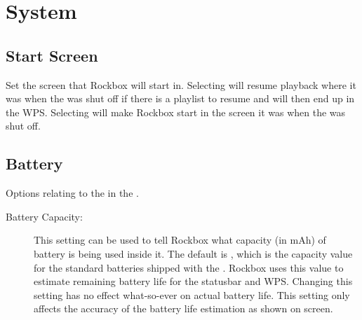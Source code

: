 \section{\label{ref:SystemOptions}System}
\subsection{Start Screen}
    Set the screen that Rockbox will start in. Selecting
     will resume playback where it was when the \dap{}
    was shut off if there is a playlist to resume and will then end up in the
    WPS. Selecting  will make Rockbox start in the
    screen it was when the \dap{} was shut off.

\subsection{Battery}
    Options relating to the 
    in the \dap.
  \begin{description}
    \item [Battery Capacity: ]This setting can be used to tell Rockbox what
      capacity (in mAh) of battery is being used inside it. The default is
      , which is the capacity value for the standard batteries shipped with the
      \dap. Rockbox uses this value to estimate remaining battery life for the 
      statusbar and WPS. Changing this setting has no effect what-so-ever on 
      actual battery life. This setting only affects the accuracy of the 
      battery life estimation as shown on screen.
   
    
  \end{description}

